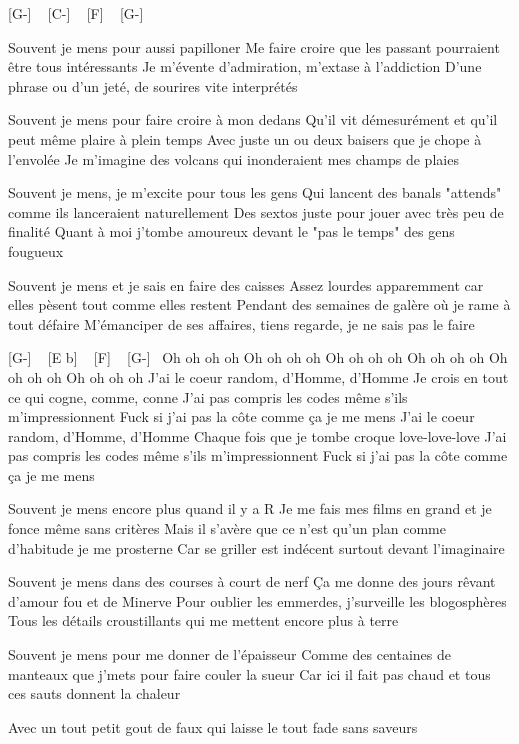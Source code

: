 

[G-] ~ [C-] ~ [F] ~ [G-]~

Souvent je mens pour aussi papilloner
Me faire croire que les passant pourraient être tous intéressants
Je m'évente d'admiration, m'extase à l'addiction
D'une phrase ou d'un jeté, de sourires vite interprétés

Souvent je mens pour faire croire à mon dedans
Qu'il vit démesurément et qu'il peut même plaire à plein temps
Avec juste un ou deux baisers que je chope à l'envolée
Je m'imagine des volcans qui inonderaient mes champs de plaies


Souvent je mens, je m'excite pour tous les gens
Qui lancent des banals "attends" comme ils lanceraient naturellement
Des sextos juste pour jouer avec très peu de finalité
Quant à moi j'tombe amoureux devant le "pas le temps" des gens fougueux

Souvent je mens et je sais en faire des caisses
Assez lourdes apparemment car elles pèsent tout comme elles restent
Pendant des semaines de galère où je rame à tout défaire
M'émanciper de ses affaires, tiens regarde, je ne sais pas le faire

[G-] ~ [E b] ~ [F]  ~ [G-]~ 
Oh oh oh oh
Oh oh oh oh
Oh oh oh oh
Oh oh oh oh
Oh oh oh oh
Oh oh oh oh
J'ai le coeur random, d'Homme, d'Homme
Je crois en tout ce qui cogne, comme, conne
J'ai pas compris les codes même s'ils m'impressionnent
Fuck si j'ai pas la côte comme ça je me mens
J'ai le coeur random, d'Homme, d'Homme
Chaque fois que je tombe croque love-love-love
J'ai pas compris les codes même s'ils m'impressionnent
Fuck si j'ai pas la côte comme ça je me mens

Souvent je mens encore plus quand il y a R
Je me fais mes films en grand et je fonce même sans critères
Mais il s'avère que ce n'est qu'un plan comme d'habitude je me prosterne
Car se griller est indécent surtout devant l'imaginaire

Souvent je mens dans des courses à court de nerf
Ça me donne des jours rêvant d'amour fou et de Minerve
Pour oublier les emmerdes, j'surveille les blogosphères
Tous les détails croustillants qui me mettent encore plus à terre

Souvent je mens pour me donner de l'épaisseur
Comme des centaines de manteaux que j'mets pour faire couler la sueur
Car ici il fait pas chaud et tous ces sauts donnent la chaleur

Avec un tout petit gout de faux qui laisse le tout fade sans saveurs

